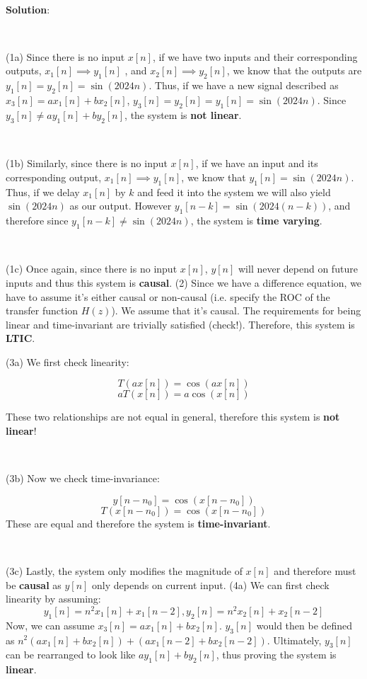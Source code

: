 \documentclass{article}
\begin{document}
\

\noindent \textbf{Solution}: 

\

\noindent (1a) Since there is no input $x[n]$, if we have two inputs and their corresponding outputs, $x_1[n]\implies y_1[n]$ , and $x_2[n] \implies y_2[n]$, we know that the outputs are $y_1[n]=y_2[n]=\sin(2024n)$. Thus, if we have a new signal described as $x_3[n]=ax_1[n]+bx_2[n]$, $y_3[n]=y_2[n]=y_1[n]=\sin(2024n)$. Since $y_3[n] \neq ay_1[n]+by_2[n]$, the system is \textbf{not linear}.

\

\noindent (1b) Similarly, since there is no input $x[n]$, if we have an input and its corresponding output, $x_1[n] \implies y_1[n]$, we know that $y_1[n]=\sin(2024n)$. Thus, if we delay $x_1[n]$ by $k$ and feed it into the system we will also yield $\sin(2024n)$ as our output. However $y_1[n-k]=\sin(2024(n-k))$, and therefore since $y_1[n-k] \neq \sin(2024n)$, the system is \textbf{time varying}.

\

\noindent (1c) Once again, since there is no input $x[n]$, $y[n]$ will never depend on future inputs and thus this system is \textbf{causal}.
\newline
\newline
\newline
\newline
\noindent (2) Since we have a difference equation, we have to assume it's either causal or non-causal (i.e. specify the ROC of the transfer function $H(z)$). We assume that it's causal. The requirements for being linear and time-invariant are trivially satisfied (check!). Therefore, this system is \textbf{LTIC}.

\newpage

\noindent (3a) We first check linearity:

$$T(ax[n]) = \cos(ax[n])$$
$$aT(x[n]) = a \cos(x[n])$$

\noindent These two relationships are not equal in general, therefore this system is \textbf{not linear}! 

\

\noindent (3b) Now we check time-invariance:

$$y[n-n_0] = \cos(x[n-n_0])$$
$$T(x[n-n_0])=\cos(x[n-n_0])$$
\noindent These are equal and therefore the system is \textbf{time-invariant}.

\

\noindent (3c) Lastly, the system only modifies the magnitude of $x[n]$ and therefore must be \textbf{causal} as $y[n]$ only depends on current input.
\newline
\newline
\newline
\newline
\noindent (4a) We can first check linearity by assuming:
$$y_1[n]=n^2x_1[n]+x_1[n-2], y_2[n]=n^2x_2[n]+x_2[n-2]$$
\noindent Now, we can assume $x_3[n]=ax_1[n]+bx_2[n]$. $y_3[n]$ would then be defined as $n^2(ax_1[n]+bx_2[n])+(ax_1[n-2]+bx_2[n-2])$. Ultimately, $y_3[n]$ can be rearranged to look like $ay_1[n]+by_2[n]$, thus proving the system is \textbf{linear}.
\end{document}
